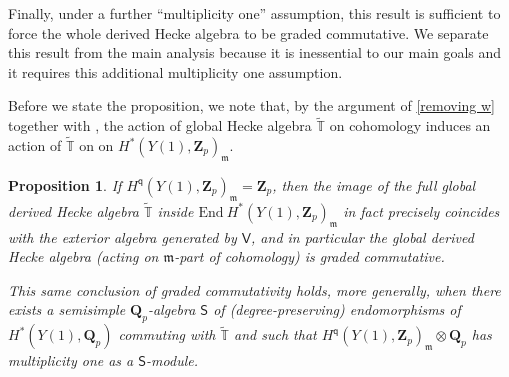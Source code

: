 \documentclass[10pt]{amsart}
\newcommand{\changecolor}{black}
\newcommand{\Z}{\mathbf{Z}}
\newcommand{\gHecke}{\tilde{\mathbb{T}}}
\newcommand{\End}{\mathrm{End}}
\newcommand{\Q}{\mathbf{Q}}
\newtheorem{prop}[subsection]{Proposition}
\theoremstyle{remark}
\newcommand{\BWq}{\mathsf{q}}
\begin{document}
{\color{\changecolor}  Finally,   under a further ``multiplicity one'' assumption, this result is sufficient to force the whole
derived Hecke algebra to be graded commutative.  We separate this result
from the main analysis because it is inessential to our main goals and it requires this additional multiplicity one assumption.

Before we state the proposition, we note that, by the argument of \eqref{removing w}
together with \cite[Lemma 6.20]{KT}, the action of global Hecke algebra $\gHecke$ 
on cohomology induces an action of $\gHecke$ on 
  on $H^*(Y(1), \Z_p)_{\mathfrak{m}}$.


\begin{prop} \label{P853}
  If   $H^{\BWq}(Y(1), \Z_p)_{\mathfrak{m}}  = \Z_p$,
then the 
image of the full global derived Hecke algebra $\gHecke$ inside $\End \ H^*(Y(1), \Z_p)_{\mathfrak{m}}$ in fact precisely coincides with the exterior algebra generated by $\mathsf{V}$,
and in particular the global derived Hecke algebra (acting on $\mathfrak{m}$-part of cohomology) is graded commutative.
 
This same conclusion of graded commutativity holds, more generally, when there exists a semisimple  $\Q_p$-algebra $\mathsf{S}$ of   (degree-preserving) endomorphisms of $H^*(Y(1), \Q_p)$
 commuting with $\gHecke$ and such that $H^{\BWq}(Y(1), \Z_p)_{\mathfrak{m}} \otimes \Q_p$ has multiplicity one as a $\mathsf{S}$-module.   \end{prop}}
 
\end{document}
